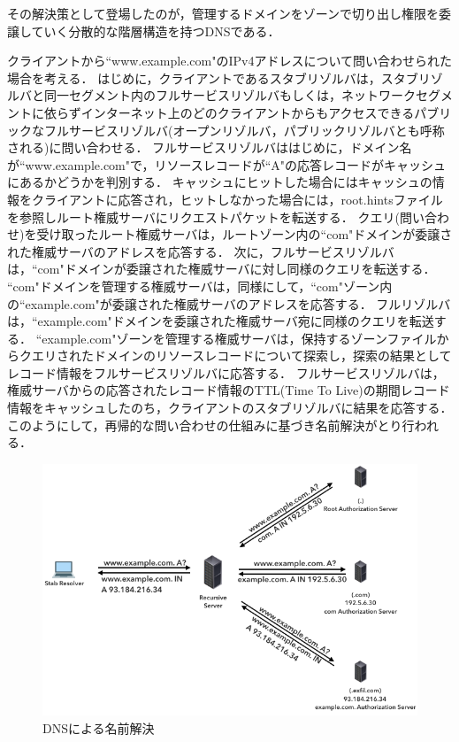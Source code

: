 その解決策として登場したのが，管理するドメインをゾーンで切り出し権限を委譲していく分散的な階層構造を持つDNSである．


クライアントから``www.example.com"のIPv4アドレスについて問い合わせられた場合を考える．
はじめに，クライアントであるスタブリゾルバは，スタブリゾルバと同一セグメント内のフルサービスリゾルバもしくは，ネットワークセグメントに依らずインターネット上のどのクライアントからもアクセスできるパブリックなフルサービスリゾルバ(オープンリゾルバ，パブリックリゾルバとも呼称される)に問い合わせる．
フルサービスリゾルバははじめに，ドメイン名が``www.example.com"で，リソースレコードが``A"の応答レコードがキャッシュにあるかどうかを判別する．
キャッシュにヒットした場合にはキャッシュの情報をクライアントに応答され，ヒットしなかった場合には，root.hintsファイルを参照しルート権威サーバにリクエストパケットを転送する．
クエリ(問い合わせ)を受け取ったルート権威サーバは，ルートゾーン内の``com"ドメインが委譲された権威サーバのアドレスを応答する．
次に，フルサービスリゾルバは，``com"ドメインが委譲された権威サーバに対し同様のクエリを転送する．
``com"ドメインを管理する権威サーバは，同様にして，``com"ゾーン内の``example.com"が委譲された権威サーバのアドレスを応答する．
フルリゾルバは，``example.com"ドメインを委譲された権威サーバ宛に同様のクエリを転送する．
``example.com"ゾーンを管理する権威サーバは，保持するゾーンファイルからクエリされたドメインのリソースレコードについて探索し，探索の結果としてレコード情報をフルサービスリゾルバに応答する．
フルサービスリゾルバは，権威サーバからの応答されたレコード情報のTTL(Time To Live)の期間レコード情報をキャッシュしたのち，クライアントのスタブリゾルバに結果を応答する．
このようにして，再帰的な問い合わせの仕組みに基づき名前解決がとり行われる．

\begin{figure}[h]
 \centering
 \includegraphics[width=12.0cm]{figure/dns-name-resolution.png}
 \caption{DNSによる名前解決}
 \label{fig:dns-name-resolution}
\end{figure}

